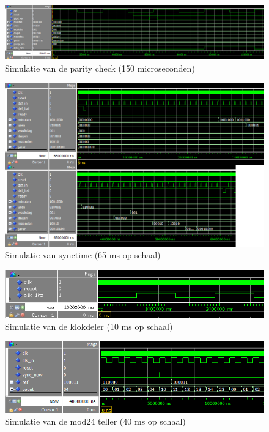 \begin{figure}[ht!]
\includegraphics[width=\textwidth,height=\textheight,keepaspectratio]{Figuren/DCF77/Parity_check.png}
\caption{Simulatie van de parity check (150 microseconden)}
\end{figure}
\begin{figure}[ht!]
\includegraphics[width=\textwidth,height=\textheight,keepaspectratio]{Figuren/DCF77/Synctime.png}
\caption{Simulatie van synctime (65 ms op schaal)}
\end{figure}
\begin{figure}[ht!]
\includegraphics[width=\textwidth,height=\textheight,keepaspectratio]{Figuren/DCF77/Klokdeler.png}
\caption{Simulatie van de  klokdeler (10 ms op schaal)}
\end{figure}
\begin{figure}[ht!]
\includegraphics[width=\textwidth,height=\textheight,keepaspectratio]{Figuren/DCF77/Mod24_teller.png}
\caption{Simulatie van de mod24 teller (40 ms op schaal)}
\end{figure}
